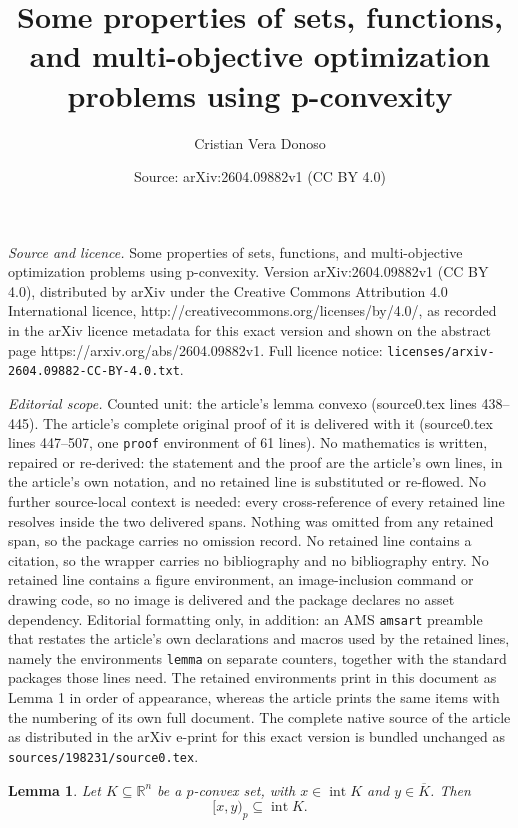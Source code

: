 \documentclass[10pt,a4paper]{amsart}
\title{Some properties of sets, functions, and multi-objective optimization problems using p-convexity}
\author{Cristian Vera Donoso}
\date{Source: arXiv:2604.09882v1 (CC BY 4.0)}
\newtheorem{lemma}{Lemma}
\begin{document}
\maketitle

\noindent\emph{Source and licence.} Some properties of sets, functions, and multi-objective optimization problems using p-convexity. Version arXiv:2604.09882v1 (CC BY 4.0), distributed by arXiv under the Creative Commons Attribution 4.0 International licence, http://creativecommons.org/licenses/by/4.0/, as recorded in the arXiv licence metadata for this exact version and shown on the abstract page https://arxiv.org/abs/2604.09882v1. Full licence notice: \texttt{licenses/arxiv-2604.09882-CC-BY-4.0.txt}.\par\smallskip

\noindent\textit{Editorial scope.} Counted unit: the article's lemma convexo (source0.tex lines 438--445). The article's complete original proof of it is delivered with it (source0.tex lines 447--507, one \texttt{proof} environment of 61 lines). No mathematics is written, repaired or re-derived: the statement and the proof are the article's own lines, in the article's own notation, and no retained line is substituted or re-flowed.  No further source-local context is needed: every cross-reference of every retained line resolves inside the two delivered spans.  Nothing was omitted from any retained span, so the package carries no omission record.  No retained line contains a citation, so the wrapper carries no bibliography and no bibliography entry.  No retained line contains a figure environment, an image-inclusion command or drawing code, so no image is delivered and the package declares no asset dependency.  Editorial formatting only, in addition: an AMS \texttt{amsart} preamble that restates the article's own declarations and macros used by the retained lines, namely the environments \texttt{lemma} on separate counters, together with the standard packages those lines need.  The retained environments print in this document as Lemma 1 in order of appearance, whereas the article prints the same items with the numbering of its own full document.  The complete native source of the article as distributed in the arXiv e-print for this exact version is bundled unchanged as \texttt{sources/198231/source0.tex}.
\begin{lemma}
Let $K \subseteq \mathbb{R}^{n}$ be a $p$-convex set, with
$x \in \operatorname{int} K$ and $y \in \overline{K}$. Then
\[
[x,y)_{p} \subseteq \operatorname{int} K.
\]
\label{trazo p convexo}
\end{lemma}
\end{document}
